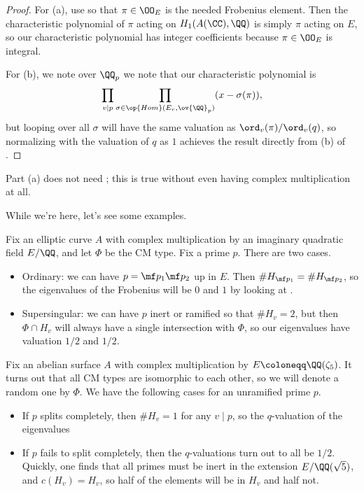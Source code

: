 \documentclass[../notes.tex]{subfiles}
\begin{document}
\begin{proof}
	For (a), use  so that $\pi\in\OO_E$ is the needed Frobenius element. Then the characteristic polynomial of $\pi$ acting on $H_1(A(\CC),\QQ)$ is simply $\pi$ acting on $E$, so our characteristic polynomial has integer coefficients because $\pi\in\OO_E$ is integral.

	For (b), we note over $\QQ_p$ we note that our characteristic polynomial is
	\[\prod_{v\mid p}\prod_{\sigma\in\op{Hom}(E_v,\ov{\QQ}_p)}(x-\sigma(\pi)),\]
	but looping over all $\sigma$ will have the same valuation as $\ord_v(\pi)/\ord_v(q)$, so normalizing with the valuation of $q$ as $1$ achieves the result directly from (b) of .
\end{proof}
\begin{remark}
	Part (a) does not need ; this is true without even having complex multiplication at all.
\end{remark}
While we're here, let's see some examples.
\begin{example}
	Fix an elliptic curve $A$ with complex multiplication by an imaginary quadratic field $E/\QQ$, and let $\Phi$ be the CM type. Fix a prime $p$. There are two cases.
	\begin{itemize}
		\item Ordinary: we can have $p=\mf p_1\mf p_2$ up in $E$. Then $\#H_{\mf p_1}=\#H_{\mf p_2}$, so the eigenvalues of the Frobenius will be $0$ and $1$ by looking at .
		\item Supersingular: we can have $p$ inert or ramified so that $\#H_v=2$, but then $\Phi\cap H_v$ will always have a single intersection with $\Phi$, so our eigenvalues have valuation $1/2$ and $1/2$.
	\end{itemize}
\end{example}
\begin{example}
	Fix an abelian surface $A$ with complex multiplication by $E\coloneqq\QQ(\zeta_5)$. It turns out that all CM types are isomorphic to each other, so we will denote a random one by $\Phi$. We have the following cases for an unramified prime $p$.
	\begin{itemize}
		\item If $p$ splits completely, then $\#H_v=1$ for any $v\mid p$, so the $q$-valuation of the eigenvalues 
		\item If $p$ fails to split completely, then the $q$-valuations turn out to all be $1/2$. Quickly, one finds that all primes must be inert in the extension $E/\QQ(\sqrt5)$, and $c(H_v)=H_v$, so half of the elements will be in $H_v$ and half not.
	\end{itemize}
\end{example}
\end{document}

